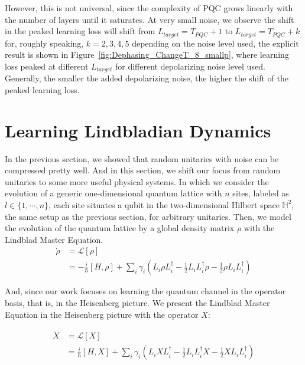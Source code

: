 \documentclass[%
 reprint,
superscriptaddress,
 amsmath,amssymb,
 aps,
]{revtex4-2}
\begin{document}
However, this is not universal, since the complexity of PQC grows linearly with the number of layers until it saturates. At very small noise, we observe the shift in the peaked learning loss will shift from $L_{target}=T_{PQC}+1$ to $L_{target}=T_{PQC}+k$ for, roughly speaking, $k=2, 3, 4, 5$ depending on the noise level used, the explicit result is shown in Figure~\ref{fig:Dephasing_ChangeT_8_smallp}, where learning loss peaked at different $L_{target}$ for different depolarizing noise level used. Generally, the smaller the added depolarizing noise, the higher the shift of the peaked learning loss.

\section{Learning Lindbladian Dynamics}

In the previous section, we showed that random unitaries with noise can be compressed pretty well. And in this section, we shift our focus from random unitaries to some more useful physical systems. In which we consider the evolution of a generic one-dimensional quantum lattice with $n$ sites, labeled as $l\in\{1, \cdots, n\}$, each site situates a qubit in the two-dimensional Hilbert space $\mathbb{H}^2$, the same setup as the previous section, for arbitrary unitaries. Then, we model the evolution of the quantum lattice by a global density matrix $\rho$ with the Lindblad Master Equation.
\begin{equation}
\begin{split}
    \dot{\rho} &= \mathcal{L}[\rho]\\
    &=-\frac{i}{\hbar}[H, \rho]+\sum_{i}\gamma_i\left(L_i\rho L_i^\dagger - \frac{1}{2}L_iL_i^\dagger\rho- \frac{1}{2}\rho L_iL_i^\dagger\right)
\end{split}
\end{equation}

And, since our work focuses on learning the quantum channel in the operator basis, that is, in the Heisenberg picture. We present the Lindblad Master Equation in the Heisenberg picture with the operator $X$:

\begin{equation}
\begin{split}
    \dot{X} &= \mathcal{L}[X]\\
    &=\frac{i}{\hbar}[H, X]+\sum_{i}\gamma_i\left(L_iX L_i^\dagger - \frac{1}{2}L_iL_i^\dagger X- \frac{1}{2}X L_iL_i^\dagger\right)
\end{split}
\end{equation}
\end{document}
